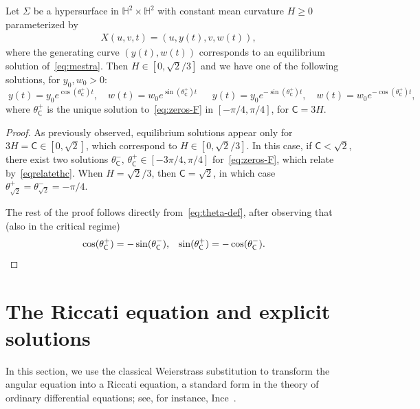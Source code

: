 \documentclass[11pt,a4paper]{amsart}
\renewcommand{\S}{\Sigma}
\theoremstyle{plain}
\theoremstyle{remark}
\newcommand{\Hyp}{\mathbb{H}}
\newcommand{\C}{\mathsf{C}}
\begin{document}
\begin{proposition}\label{propEqSol}
Let $\S$ be a hypersurface in $\Hyp^2\times\Hyp^2$ with constant mean
curvature $H\geq 0$
parameterized by 
\begin{align*}
X(u,v,t) = (u,y(t),v,w(t)),
\end{align*}
where the generating curve $(y(t),w(t))$ corresponds to
an equilibrium solution of~\eqref{eq:mestra}. Then $H\in [0,\sqrt{2}/3]$
and we have one of the following
solutions, for $y_0,w_0>0$:
\begin{equation}\label{eq:equilsol}
\boxed{\;
y(t) = y_0e^{\cos(\theta_\C^+)t},\quad 
w(t) = w_0e^{\sin(\theta_\C^+)t}\;}
\quad
\boxed{\;
y(t) = y_0e^{-\sin(\theta_\C^+)t},\quad
w(t) = w_0e^{-\cos(\theta_\C^+)t},\;}
\end{equation}
where $\theta_\C^+$ is the unique solution to~\eqref{eq:zeros-F}
in $[-\pi/4,\pi/4]$, for $\C = 3H$.
\end{proposition}
\begin{proof}
As previously observed, equilibrium solutions appear only for
$3H = \C\in[0,\sqrt{2}]$, which correspond to 
$H\in[0,\sqrt{2}/3]$. In this 
case, if $\C<\sqrt{2}$, there exist two solutions 
$\theta_\C^-,\,\theta_\C^+\in [-3\pi/4,\pi/4]$
for~\eqref{eq:zeros-F}, which relate by~\eqref{eqrelatethc}.
When $H = \sqrt{2}/3$, then $\C = \sqrt{2}$, in which case
$\theta^+_{\sqrt{2}} = \theta^-_{\sqrt{2}} = -\pi/4$.

The rest of the proof follows directly from~\eqref{eq:theta-def},
after observing that (also in the critical regime)
\begin{align*}
\cos(\theta_\C^+)& = -\sin(\theta_\C^-),&
\sin(\theta_\C^+)& = -\cos(\theta_\C^-).\qedhere
\end{align*}
\end{proof}

\section{The Riccati equation and explicit solutions}
\label{sec:solucao}


In this section, we use the classical Weierstrass substitution to transform
the angular equation into a Riccati equation, a standard form in the theory of
ordinary differential equations; see, for instance, Ince~\cite[pp.~23--25]{Ince1956}.

 
\end{document}
